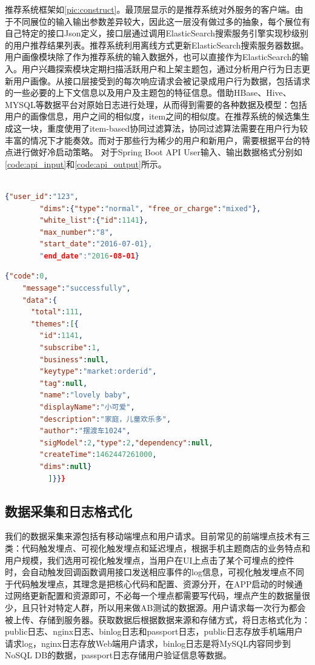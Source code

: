     推荐系统框架如\autoref{pic:construct}。最顶层显示的是推荐系统对外服务的客户端。由于不同展位的输入输出参数差异较大，因此这一层没有做过多的抽象，每个展位有自己特定的接口Json定义，接口层通过调用ElasticSearch搜索服务引擎实现秒级别的用户推荐结果列表。推荐系统利用离线方式更新ElasticSearch搜索服务器数据。用户画像模块除了作为推荐系统的输入数据外，也可以直接作为ElasticSearch的输入。用户兴趣探索模块定期扫描活跃用户和上架主题包，通过分析用户行为日志更新用户画像。从接口层接受到的每次响应请求会被记录成用户行为数据，包括请求的一些必要的上下文信息以及用户及主题包的特征信息。借助HBase、Hive、MYSQL等数据平台对原始日志进行处理，从而得到需要的各种数据及模型：包括用户的画像信息，用户之间的相似度，item之间的相似度。在推荐系统的候选集生成这一块，重度使用了item-based协同过滤算法，协同过滤算法需要在用户行为较丰富的情况下才能奏效。而对于那些行为稀少的用户和新用户，需要根据平台的特点进行做好冷启动策略。
    对于Spring Boot API User输入、输出数据格式分别如\autoref{code:api_input}和\autoref{code:api_output}所示。\\\\
    \begin{lstlisting}[language=json,firstnumber=1,label={code:api_input}]
      {"user_id":"123",
        "dims":{"type":"normal", "free_or_charge":"mixed"},
        "white_list":{"id":1141},
        "max_number":"8",
        "start_date":"2016-07-01},
        "end_date":"2016-08-01}
    \end{lstlisting}

    \begin{lstlisting}[language=json,firstnumber=1,label={code:api_output}]
    {"code":0,
    "message":"successfully",
    "data":{
      "total":111,
      "themes":[{
        "id":1141,
        "subscribe":1,
        "business":null,
        "keytype":"market:orderid",
        "tag":null,
        "name":"lovely baby",
        "displayName":"小可爱",
        "description":"家庭，儿童欢乐多",
        "author":"摆渡车1024",
        "sigModel":2,"type":2,"dependency":null,
        "createTime":1462447261000,
        "dims":null}
          ]}}}
    \end{lstlisting}

    \subsection{数据采集和日志格式化}
    我们的数据采集来源包括有移动端埋点和用户请求。目前常见的前端埋点技术有三类：代码触发埋点、可视化触发埋点和延迟埋点，根据手机主题商店的业务特点和用户规模，我们选用可视化触发埋点，当用户在UI上点击了某个可埋点的控件时，会自动触发回调函数调用接口发送相应事件的log信息，可视化触发埋点不同于代码触发埋点，其理念是把核心代码和配置、资源分开，在APP启动的时候通过网络更新配置和资源即可，不必每一个埋点都需要写代码，埋点产生的数据量很少，且只针对特定人群，所以用来做AB测试的数据源。用户请求每一次行为都会被上传、存储到服务器。获取数据后根据数据来源和存储方式，将日志格式化为：public日志、nginx日志、binlog日志和passport日志，public日志存放手机端用户请求log，nginx日志存放Web端用户请求，binlog日志是将MySQL内容同步到NoSQL DB的数据，passport日志存储用户验证信息等数据。

